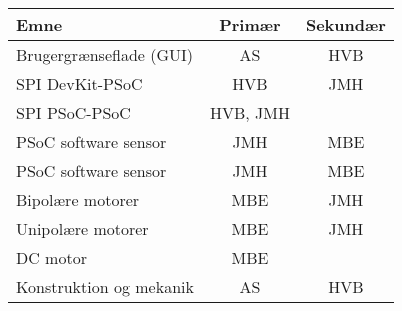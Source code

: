 \begin{tabular}{| l | c | c |}
\hline
Emne & Primær & Sekundær\\\hline
Brugergrænseflade (GUI) & AS & HVB\\\hline
SPI DevKit-PSoC & HVB & JMH\\\hline
SPI PSoC-PSoC & HVB, JMH & \\\hline
PSoC software sensor & JMH & MBE\\\hline
PSoC software sensor & JMH & MBE\\\hline
Bipolære motorer & MBE & JMH\\\hline
Unipolære motorer & MBE & JMH\\\hline
DC motor & MBE & \\\hline
Konstruktion og mekanik & AS & HVB\\\hline
\end{tabular}